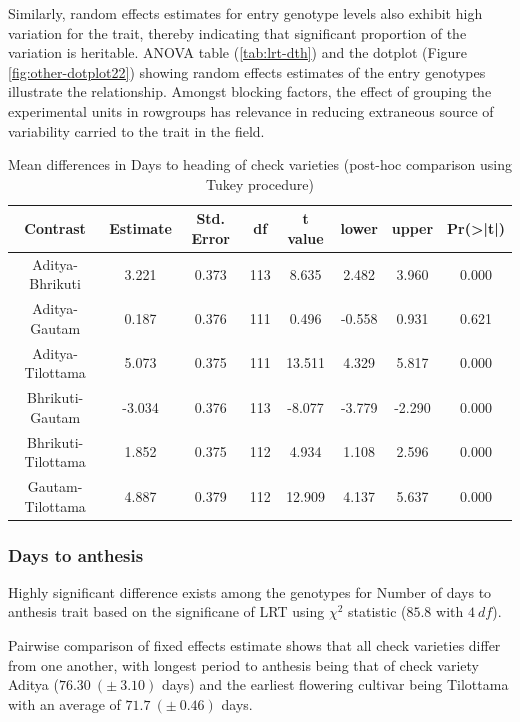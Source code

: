 \documentclass[12pt,oneside]{dukestatscithesis} %
\begin{document}
Similarly, random effects estimates for entry genotype levels also exhibit high variation for the trait, thereby indicating that significant proportion of the variation is heritable. ANOVA table (\ref{tab:lrt-dth}) and the dotplot (Figure \ref{fig:other-dotplot22}) showing random effects estimates of the entry genotypes illustrate the relationship. Amongst blocking factors, the effect of grouping the experimental units in rowgroups has relevance in reducing extraneous source of variability carried to the trait in the field.
\begin{table}[H]

\caption{\label{tab:other-meanconf-tab6}Mean differences in Days to heading of check varieties (post-hoc comparison using Tukey procedure)}
\centering
\begin{tabular}[t]{cccccccc}
\toprule
Contrast & Estimate & Std. Error & df & t value & lower & upper & Pr(>|t|)\\
\midrule
Aditya-Bhrikuti & 3.221 & 0.373 & 113 & 8.635 & 2.482 & 3.960 & 0.000\\
Aditya-Gautam & 0.187 & 0.376 & 111 & 0.496 & -0.558 & 0.931 & 0.621\\
Aditya-Tilottama & 5.073 & 0.375 & 111 & 13.511 & 4.329 & 5.817 & 0.000\\
Bhrikuti-Gautam & -3.034 & 0.376 & 113 & -8.077 & -3.779 & -2.290 & 0.000\\
Bhrikuti-Tilottama & 1.852 & 0.375 & 112 & 4.934 & 1.108 & 2.596 & 0.000\\
Gautam-Tilottama & 4.887 & 0.379 & 112 & 12.909 & 4.137 & 5.637 & 0.000\\
\bottomrule
\end{tabular}
\end{table}
\hypertarget{days-to-anthesis}{%
\subsubsection{Days to anthesis}\label{days-to-anthesis}}

Highly significant difference exists among the genotypes for Number of days to anthesis trait based on the significane of LRT using \(\chi^2\) statistic (\(85.8\) with \(4\ df\)).

Pairwise comparison of fixed effects estimate shows that all check varieties differ from one another, with longest period to anthesis being that of check variety Aditya (\(76.30\ (\pm\ 3.10)\) days) and the earliest flowering cultivar being Tilottama with an average of \(71.7\ (\pm\ 0.46)\) days.
\end{document}
